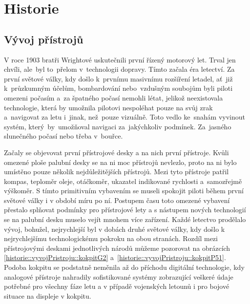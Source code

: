 \chapter{Historie}
	\section{Vývoj přístrojů}
	
		V roce 1903 bratři Wrightové uskutečnili první řízený motorový let. Trval jen chvíli, ale~byl to~přelom v~technologii dopravy. Tímto začala éra letectví. Za první světové války, kdy došlo k~prvnímu masivnímu rozšíření letadel,  ať~již k~průzkumným účelům, bombardování nebo~vzdušným soubojům byli piloti omezeni počasím a~za špatného počasí nemohli létat, jelikož neexistovala technologie, která by umožnila pilotovi nespoléhat pouze na svůj zrak a~navigovat za letu i~jinak, než~pouze vizuálně. Toto vedlo ke~snahám vyvinout systém, který~by~umožňoval navigaci za~jakýchkoliv podmínek. Za~jasného slunečného počasí nebo třeba v~bouřce.\par
		
		Začaly se objevovat první přístrojové desky a na nich první přístroje. Kvůli omezené ploše palubní desky se na ni moc přístrojů nevlezlo, proto na ni bylo umístěno pouze několik nejdůležitějších přístrojů. Mezi tyto přístroje patřil kompas, teploměr oleje, otáčkoměr, ukazatel indikované rychlosti a~samozřejmě výškoměr. S tímto primitivním vybavením se museli spokojit piloti během první světové války i v období míru po ní. Postupem času toto omezené vybavení přestalo splňovat podmínky pro přístrojové lety a s nástupem nových technologií se na palubní desku muselo vejít mnohem více zařízení. Každé letectvo prodělalo vývoj, bohužel, nejrychlejší byl v dobách druhé světové války, kdy došlo k nejrychlejšímu technologickému pokroku na obou stranách. Rozdíl mezi přístrojovými deskami jednotlivých národů můžeme pozorovat na obrázcích \ref{historie::vyvojPristroju::kokpitG2} a~\ref{historie::vyvojPristroju::kokpitP51}.
		Podoba kokpitu se podstatně neměnila až do příchodu digitální technologie, kdy analogové přístroje nahradily sofistikované systémy zobrazující veškeré údaje potřebné pro všechny fáze letu a v případě vojenských letounů i pro bojové situace na displeje v kokpitu. 
		
